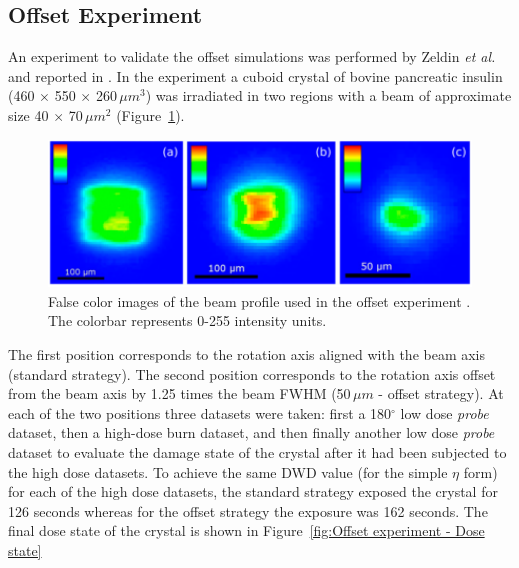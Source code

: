 \subsection{Offset Experiment}
\label{sub:Offset Experiment}
An experiment to validate the offset simulations was performed by Zeldin \textit{et al.} and reported in \cite{zeldin2013dwd}.
In the experiment a cuboid crystal of bovine pancreatic insulin (460 $\times$ 550 $\times$ 260$\,\mu m^3$) was irradiated in two regions with a beam of approximate size 40 $\times$ 70$\,\mu m^2$ (Figure~\ref{fig:Offset experiment - Beam}).
\begin{figure}
  \centering
    \includegraphics[width=1\textwidth]{figures/dwd/Oli_beams.png}
    \caption{False color images of the beam profile used in the offset experiment \cite{zeldin2013dwd}. The colorbar represents 0-255 intensity units.}
    \label{fig:Offset experiment - Beam}
\end{figure}
The first position corresponds to the rotation axis aligned with the beam axis (standard strategy).
The second position corresponds to the rotation axis offset from the beam axis by 1.25 times the beam FWHM (50$\,\mu m$ - offset strategy).
At each of the two positions three datasets were taken: first a 180$^{\circ}$ low dose \textit{probe} dataset, then a high-dose burn dataset, and then finally another low dose \textit{probe} dataset to evaluate the damage state of the crystal after it had been subjected to the high dose datasets.
To achieve the same DWD value (for the simple $\eta$ form) for each of the high dose datasets, the standard strategy exposed the crystal for 126 seconds whereas for the offset strategy the exposure was 162 seconds.
The final dose state of the crystal is shown in Figure~\ref{fig:Offset experiment - Dose state}
